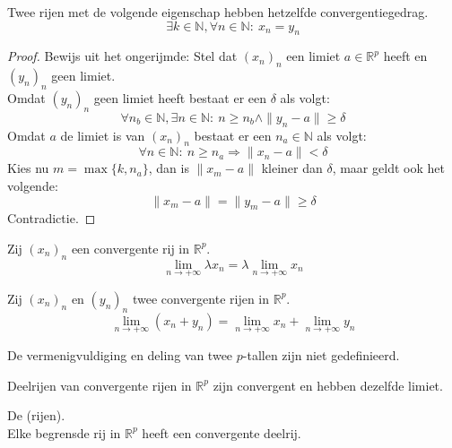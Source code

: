 \documentclass[main.tex]{subfiles}
\begin{document}
\begin{pr}
  Twee rijen met de volgende eigenschap hebben hetzelfde convergentiegedrag.
  \[ \exists k\in \mathbb{N}, \forall n \in \mathbb{N}:\ x_{n} = y_{n} \]

  \begin{proof}
    Bewijs uit het ongerijmde: Stel dat $(x_{n})_{n}$ een limiet $a\in\mathbb{R}^{p}$ heeft en $(y_{n})_{n}$ geen limiet.\\
    Omdat $(y_{n})_{n}$ geen limiet heeft bestaat er een $\delta$ als volgt:
    \[ \forall n_{b}\in \mathbb{N},\exists n\in \mathbb{N}:\ n \ge n_{b} \wedge\|y_{n}-a\| \ge \delta \]
    Omdat $a$ de limiet is van $(x_{n})_{n}$ bestaat er een $n_{a}\in \mathbb{N}$ als volgt:
    \[ \forall n\in \mathbb{N}:\ n\ge n_{a} \Rightarrow \|x_{n}-a\| <\delta \]
    Kies nu $m = \max\{k,n_{a}\}$, dan is $\|x_{m}-a\|$ kleiner dan $\delta$, maar geldt ook het volgende:
    \[ \|x_{m}-a\| = \|y_{m}-a\| \ge \delta \]
    Contradictie.
\feed
  \end{proof}
\end{pr}



\begin{st}
  Zij $(x_{n})_{n}$ een convergente rij in $\mathbb{R}^{p}$.
  \[ \lim_{n\rightarrow +\infty}\lambda x_{n} = \lambda \lim_{n\rightarrow +\infty}x_{n} \]
\end{st}

\begin{st}
  Zij $(x_{n})_{n}$ en $(y_{n})_{n}$ twee convergente rijen in $\mathbb{R}^{p}$.
  \[ \lim_{n\rightarrow +\infty}(x_{n}+y_{n}) = \lim_{n\rightarrow +\infty}x_{n}+\lim_{n\rightarrow +\infty}y_{n} \]
\end{st}

\begin{opm}
  De vermenigvuldiging en deling van twee $p$-tallen zijn niet gedefinieerd.
\end{opm}

\begin{st}
  \label{st:in-rp-deelrij-zelfde-limiet}
  Deelrijen van convergente rijen in $\mathbb{R}^{p}$ zijn convergent en hebben dezelfde limiet.
\end{st}

\begin{st}
  De  (rijen).\\
  Elke begrensde rij in $\mathbb{R}^{p}$ heeft een convergente deelrij.
\end{st}
\end{document}
